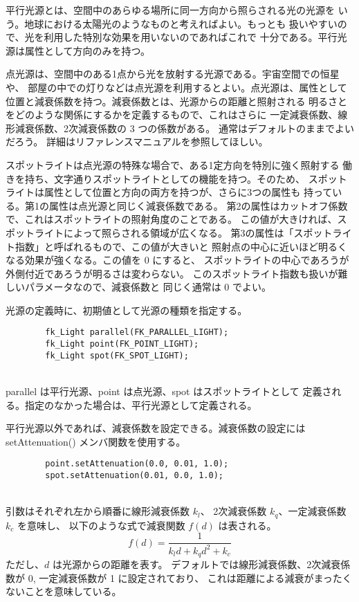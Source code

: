 平行光源とは、空間中のあらゆる場所に同一方向から照らされる光の光源を
いう。地球における太陽光のようなものと考えればよい。もっとも
扱いやすいので、光を利用した特別な効果を用いないのであればこれで
十分である。平行光源は属性として方向のみを持つ。

点光源は、空間中のある1点から光を放射する光源である。宇宙空間での恒星や、
部屋の中での灯りなどは点光源を利用するとよい。点光源は、属性として
位置と減衰係数を持つ。減衰係数とは、光源からの距離と照射される
明るさとをどのような関係にするかを定義するもので、これはさらに
一定減衰係数、線形減衰係数、2次減衰係数の 3 つの係数がある。
通常はデフォルトのままでよいだろう。
詳細はリファレンスマニュアルを参照してほしい。

スポットライトは点光源の特殊な場合で、ある1定方向を特別に強く照射する
働きを持ち、文字通りスポットライトとしての機能を持つ。そのため、
スポットライトは属性として位置と方向の両方を持つが、さらに3つの属性も
持っている。第1の属性は点光源と同じく減衰係数である。
第2の属性はカットオフ係数で、これはスポットライトの照射角度のことである。
この値が大きければ、スポットライトによって照らされる領域が広くなる。
第3の属性は「スポットライト指数」と呼ばれるもので、この値が大きいと
照射点の中心に近いほど明るくなる効果が強くなる。この値を 0 にすると、
スポットライトの中心であろうが外側付近であろうが明るさは変わらない。
このスポットライト指数も扱いが難しいパラメータなので、減衰係数と
同じく通常は 0 でよい。

光源の定義時に、初期値として光源の種類を指定する。
\\
\begin{screen}
\begin{verbatim}
        fk_Light parallel(FK_PARALLEL_LIGHT);
        fk_Light point(FK_POINT_LIGHT);
        fk_Light spot(FK_SPOT_LIGHT);
\end{verbatim}
\end{screen}
~ \\
parallel は平行光源、point は点光源、spot はスポットライトとして
定義される。指定のなかった場合は、平行光源として定義される。

平行光源以外であれば、減衰係数を設定できる。減衰係数の設定には
setAttenuation() メンバ関数を使用する。
\\
\begin{screen}
\begin{verbatim}
        point.setAttenuation(0.0, 0.01, 1.0);
        spot.setAttenuation(0.01, 0.0, 1.0);
\end{verbatim}
\end{screen}
~ \\
引数はそれぞれ左から順番に線形減衰係数 \(k_l\)、
2次減衰係数 \(k_q\)、一定減衰係数 \(k_c\) を意味し、
以下のような式で減衰関数 \(f(d)\) は表される。
\[
	f(d) = \frac{1}{k_ld + k_qd^2 + k_c}
\]
ただし、\(d\) は光源からの距離を表す。
デフォルトでは線形減衰係数、2次減衰係数が 0, 一定減衰係数が 1 に設定されており、
これは距離による減衰がまったくないことを意味している。

